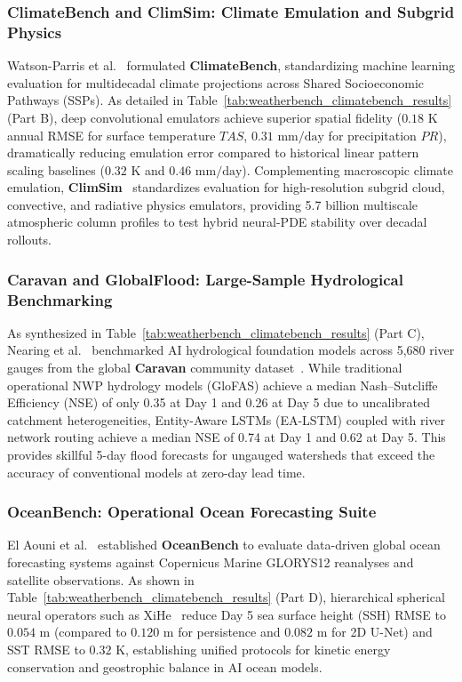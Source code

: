 \subsubsection{ClimateBench and ClimSim: Climate Emulation and Subgrid Physics}
Watson-Parris et al.~\cite{watsonparris2022climatebench} formulated \textbf{ClimateBench}, standardizing machine learning evaluation for multidecadal climate projections across Shared Socioeconomic Pathways (SSPs). As detailed in Table~\ref{tab:weatherbench_climatebench_results} (Part B), deep convolutional emulators achieve superior spatial fidelity ($0.18\text{ K}$ annual RMSE for surface temperature $TAS$, $0.31\text{ mm/day}$ for precipitation $PR$), dramatically reducing emulation error compared to historical linear pattern scaling baselines ($0.32\text{ K}$ and $0.46\text{ mm/day}$). Complementing macroscopic climate emulation, \textbf{ClimSim}~\cite{yu2023climsim} standardizes evaluation for high-resolution subgrid cloud, convective, and radiative physics emulators, providing 5.7 billion multiscale atmospheric column profiles to test hybrid neural-PDE stability over decadal rollouts.

\subsubsection{Caravan and GlobalFlood: Large-Sample Hydrological Benchmarking}
As synthesized in Table~\ref{tab:weatherbench_climatebench_results} (Part C), Nearing et al.~\cite{nearing2024globalflood} benchmarked AI hydrological foundation models across 5,680 river gauges from the global \textbf{Caravan} community dataset~\cite{kratzert2023caravan}. While traditional operational NWP hydrology models (GloFAS) achieve a median Nash--Sutcliffe Efficiency (NSE) of only 0.35 at Day 1 and 0.26 at Day 5 due to uncalibrated catchment heterogeneities, Entity-Aware LSTMs (EA-LSTM) coupled with river network routing achieve a median NSE of 0.74 at Day 1 and 0.62 at Day 5. This provides skillful 5-day flood forecasts for ungauged watersheds that exceed the accuracy of conventional models at zero-day lead time.

\subsubsection{OceanBench: Operational Ocean Forecasting Suite}
El Aouni et al.~\cite{elaouni2025oceanbench} established \textbf{OceanBench} to evaluate data-driven global ocean forecasting systems against Copernicus Marine GLORYS12 reanalyses and satellite observations. As shown in Table~\ref{tab:weatherbench_climatebench_results} (Part D), hierarchical spherical neural operators such as XiHe~\cite{wang2024xihe} reduce Day 5 sea surface height (SSH) RMSE to $0.054\text{ m}$ (compared to $0.120\text{ m}$ for persistence and $0.082\text{ m}$ for 2D U-Net) and SST RMSE to $0.32\text{ K}$, establishing unified protocols for kinetic energy conservation and geostrophic balance in AI ocean models.

